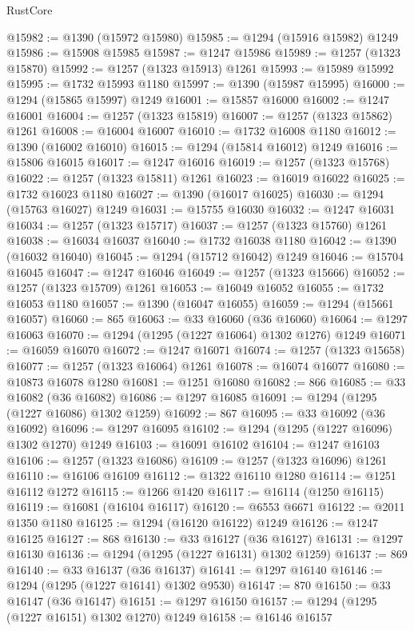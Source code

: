 \begin{lexlean}{RustCore}
\begin{coremodule}
@15982 := @1390 (@15972 @15980)
@15985 := @1294 (@15916 @15982) @1249
@15986 := @15908 @15985
@15987 := @1247 @15986
@15989 := @1257 (@1323 @15870)
@15992 := @1257 (@1323 @15913) @1261
@15993 := @15989 @15992
@15995 := @1732 @15993 @1180
@15997 := @1390 (@15987 @15995)
@16000 := @1294 (@15865 @15997) @1249
@16001 := @15857 @16000
@16002 := @1247 @16001
@16004 := @1257 (@1323 @15819)
@16007 := @1257 (@1323 @15862) @1261
@16008 := @16004 @16007
@16010 := @1732 @16008 @1180
@16012 := @1390 (@16002 @16010)
@16015 := @1294 (@15814 @16012) @1249
@16016 := @15806 @16015
@16017 := @1247 @16016
@16019 := @1257 (@1323 @15768)
@16022 := @1257 (@1323 @15811) @1261
@16023 := @16019 @16022
@16025 := @1732 @16023 @1180
@16027 := @1390 (@16017 @16025)
@16030 := @1294 (@15763 @16027) @1249
@16031 := @15755 @16030
@16032 := @1247 @16031
@16034 := @1257 (@1323 @15717)
@16037 := @1257 (@1323 @15760) @1261
@16038 := @16034 @16037
@16040 := @1732 @16038 @1180
@16042 := @1390 (@16032 @16040)
@16045 := @1294 (@15712 @16042) @1249
@16046 := @15704 @16045
@16047 := @1247 @16046
@16049 := @1257 (@1323 @15666)
@16052 := @1257 (@1323 @15709) @1261
@16053 := @16049 @16052
@16055 := @1732 @16053 @1180
@16057 := @1390 (@16047 @16055)
@16059 := @1294 (@15661 @16057)
@16060 := 865
@16063 := @33 @16060 (@36 @16060)
@16064 := @1297 @16063
@16070 := @1294 (@1295 (@1227 @16064) @1302 @1276) @1249
@16071 := @16059 @16070
@16072 := @1247 @16071
@16074 := @1257 (@1323 @15658)
@16077 := @1257 (@1323 @16064) @1261
@16078 := @16074 @16077
@16080 := @10873 @16078 @1280
@16081 := @1251 @16080
@16082 := 866
@16085 := @33 @16082 (@36 @16082)
@16086 := @1297 @16085
@16091 := @1294 (@1295 (@1227 @16086) @1302 @1259)
@16092 := 867
@16095 := @33 @16092 (@36 @16092)
@16096 := @1297 @16095
@16102 := @1294 (@1295 (@1227 @16096) @1302 @1270) @1249
@16103 := @16091 @16102
@16104 := @1247 @16103
@16106 := @1257 (@1323 @16086)
@16109 := @1257 (@1323 @16096) @1261
@16110 := @16106 @16109
@16112 := @1322 @16110 @1280
@16114 := @1251 @16112 @1272
@16115 := @1266 @1420
@16117 := @16114 (@1250 @16115)
@16119 := @16081 (@16104 @16117)
@16120 := @6553 @6671
@16122 := @2011 @1350 @1180
@16125 := @1294 (@16120 @16122) @1249
@16126 := @1247 @16125
@16127 := 868
@16130 := @33 @16127 (@36 @16127)
@16131 := @1297 @16130
@16136 := @1294 (@1295 (@1227 @16131) @1302 @1259)
@16137 := 869
@16140 := @33 @16137 (@36 @16137)
@16141 := @1297 @16140
@16146 := @1294 (@1295 (@1227 @16141) @1302 @9530)
@16147 := 870
@16150 := @33 @16147 (@36 @16147)
@16151 := @1297 @16150
@16157 := @1294 (@1295 (@1227 @16151) @1302 @1270) @1249
@16158 := @16146 @16157

\end{coremodule}
\end{lexlean}
